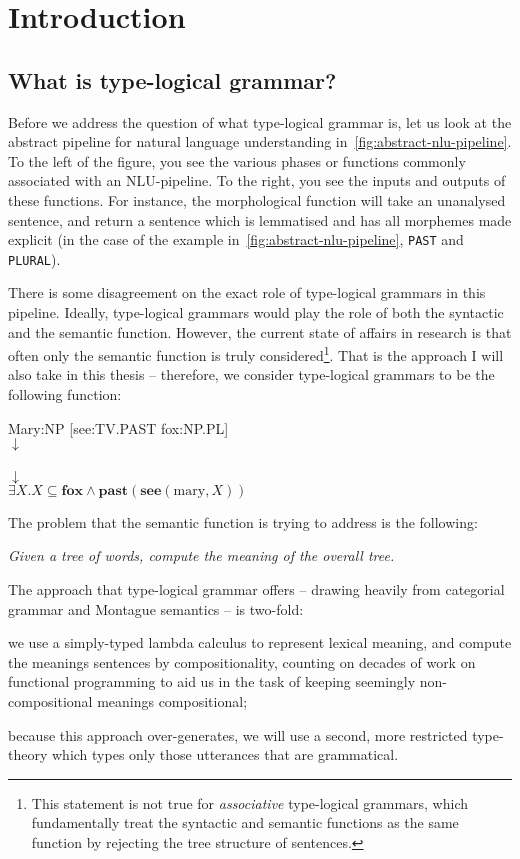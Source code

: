 \documentclass[a4paper]{article}
\begin{document}
\section{Introduction}

\subsection{What is type-logical grammar?}
Before we address the question of what type-logical grammar is, let us
look at the abstract pipeline for natural language understanding
in~\autoref{fig:abstract-nlu-pipeline}.
%
%
%
To the left of the figure, you see the various phases or functions
commonly associated with an NLU-pipeline. To the right, you see the
inputs and outputs of these functions.
For instance, the morphological function will take an unanalysed
sentence, and return a sentence which is lemmatised and has all
morphemes made explicit (in the case of the example
in~\autoref{fig:abstract-nlu-pipeline}, \texttt{PAST} and
\texttt{PLURAL}).

There is some disagreement on the exact role of type-logical grammars in
this pipeline. Ideally, type-logical grammars would play the role of
both the syntactic and the semantic function. However, the current
state of affairs in research is that often only the semantic function
is truly considered\footnote{%
  This statement is not true for \emph{associative} type-logical
  grammars, which fundamentally treat the syntactic and semantic
  functions as the same function by rejecting the tree structure of
  sentences.
}. That is the approach I will also take in this thesis -- therefore,
we consider type-logical grammars to be the following function:
%
\begin{center}
  Mary:NP [see:TV.PAST fox:NP.PL]\\
  $\downarrow$\\
  \\
  $\downarrow$\\
  $\exists X.X\subseteq\mathbf{fox}\land\mathbf{past}(\mathbf{see}(\text{mary},X))$
\end{center}
%
The problem that the semantic function is trying to address is the
following:
%
\begin{center}\itshape
  Given a tree of words, compute the meaning of the overall tree.
\end{center}
%
The approach that type-logical grammar offers -- drawing heavily from
categorial grammar and Montague semantics -- is two-fold:
\begin{enumerate*}[label=(\arabic*)]
\item we use a simply-typed lambda calculus to represent lexical
  meaning, and compute the meanings sentences by compositionality,
  counting on decades of work on functional programming to aid us in
  the task of keeping seemingly non-compositional meanings
  compositional;
\item because this approach over-generates, we will use a second, more
  restricted type-theory which types only those utterances that are
  grammatical.
\end{enumerate*}
\end{document}
